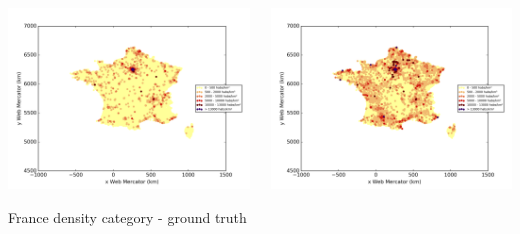 \documentclass[c]{beamer}
\begin{document}
\begin{frame}

\begin{columns}
 \begin{column}{0.5\textwidth}
  \begin{overlayarea}{\linewidth}{4cm}
    \centering\vfill
    \includegraphics[scale=0.25]{../../data/France/test/Support_Vector_Gaussian_Classification/Support_Vector_Gaussian_Classification/density_ground_truth.png}
  \end{overlayarea}
  \begin{overlayarea}{\linewidth}{0.5cm}
    \centering
    \tiny France density category - ground truth\par
  \end{overlayarea}
 \end{column}
 \begin{column}{0.5\textwidth}
  \begin{overlayarea}{\linewidth}{4cm}
    \centering\vfill
    \includegraphics[scale=0.25]{../../data/France/test/Support_Vector_Gaussian_Classification/Support_Vector_Gaussian_Classification/density_classification.png}

\end{overlayarea}
\end{column}
\end{columns}
\end{frame}
\end{document}
